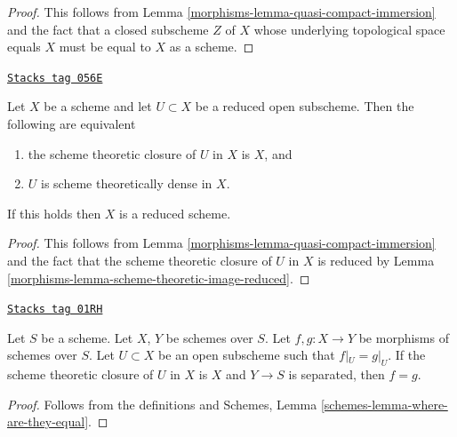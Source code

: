 \begin{proof}

This follows from
Lemma \ref{morphisms-lemma-quasi-compact-immersion}
and the fact that a closed subscheme $Z$ of $X$ whose
underlying topological space equals $X$ must be equal to $X$
as a scheme.
\end{proof}

\begin{lemma}
\label{morphisms-lemma-reduced-subscheme-closure}
\href{https://stacks.math.columbia.edu/tag/056E}{\texttt{Stacks tag 056E}}

Let $X$ be a scheme and let $U \subset X$ be a reduced open subscheme.
Then the following are equivalent
\begin{enumerate}
\item the scheme theoretic closure of $U$ in $X$ is $X$, and
\item $U$ is scheme theoretically dense in $X$.
\end{enumerate}
If this holds then $X$ is a reduced scheme.
\end{lemma}

\begin{proof}

This follows from
Lemma \ref{morphisms-lemma-quasi-compact-immersion}
and the fact that the scheme theoretic closure of $U$ in $X$ is
reduced by
Lemma \ref{morphisms-lemma-scheme-theoretic-image-reduced}.
\end{proof}


\begin{lemma}
\label{morphisms-lemma-equality-of-morphisms}
\href{https://stacks.math.columbia.edu/tag/01RH}{\texttt{Stacks tag 01RH}}

Let $S$ be a scheme. Let $X$, $Y$ be schemes over $S$.
Let $f, g : X \to Y$ be morphisms of schemes over $S$.
Let $U \subset X$ be an open subscheme such that
$f|_U = g|_U$. If the scheme theoretic closure of $U$
in $X$ is $X$ and $Y \to S$ is separated, then $f = g$.
\end{lemma}

\begin{proof}
Follows from the definitions and
Schemes, Lemma \ref{schemes-lemma-where-are-they-equal}.
\end{proof}

